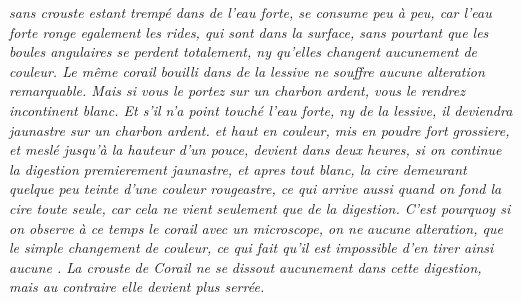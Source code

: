  \textit{sans crouste estant tremp\'{e} dans de l'eau forte, se consume peu \`{a} peu, car l'eau forte ronge egalement les rides, qui sont dans la surface, sans pourtant que les boules angulaires se perdent totalement, ny qu'elles changent aucunement de couleur.
Le m\^{e}me corail bouilli dans de la lessive ne souffre aucune alteration remarquable.
Mais si vous le portez sur un charbon ardent, vous le rendrez incontinent blanc. Et s'il n'a point touch\'{e} l'eau forte, ny de la lessive, il deviendra jaunastre sur un charbon ardent\protect{}.
\protect{}et haut en couleur, mis en poudre fort grossiere, et mesl\'{e}  jusqu'\`{a} la hauteur d'un pouce, devient dans deux heures, si%
on continue la digestion\protect{} premierement jaunastre, et apres tout blanc, la cire demeurant quelque peu teinte d'une couleur rougeastre, ce qui arrive aussi quand on fond la cire toute seule, car cela ne vient seulement que de la digestion. C'est pourquoy si on observe \`{a} ce temps le corail\protect{} avec un microscope\protect{}, on ne}  \textit{aucune alteration, que le simple changement de couleur, ce qui fait qu'il est impossible d'en tirer ainsi aucune .
La crouste de Corail\protect{} ne se}
\pend
\count{}
\count{}
\count{}
\newpage
\pstart \noindent \textit{dissout aucunement dans cette digestion,\protect{}
mais au contraire elle devient plus serr\'{e}e.}
%
